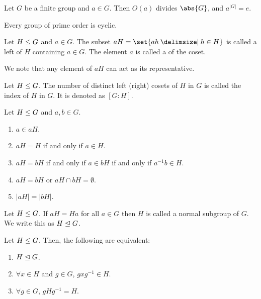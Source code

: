 \documentclass[11pt]{penrose}
\begin{document}
\begin{ncor}
    Let $G$ be a finite group and $a \in G$. Then $O(a)$ divides $\abs{G}$, and $a^{|G|} = e$.
\end{ncor}

\begin{ncor}
    Every group of prime order is cyclic.
\end{ncor}

\begin{ndfn}[Cosets]
    Let $H \mathrel{\leq} G$ and $a \in G$. The subset $aH = \set{ah \st h \in H}$ is called a left  of $H$ containing $a \in G$. The element $a$ is called a  of the coset.
\end{ndfn}

We note that any element of $aH$ can act as its representative.

\begin{ndfn}[Index]
    Let $H \mathrel{\leq} G$. The number of distinct left (right) cosets of $H$ in $G$ is called the index of $H$ in $G$. It is denoted as $[G:H]$.
\end{ndfn}

\begin{nthm}
    Let $H \mathrel{\leq} G$ and $a, b \in G$.
    \begin{enumerate}
        \item $a \in aH$.
        \item $aH = H$ if and only if $a \in H$.
        \item $aH = bH$ if and only if $a \in bH$ if and only if $a^{-1} b \in H$.
        \item $aH = bH$ or $aH \cap bH = \emptyset$.
        \item $|aH| = |bH|$.
    \end{enumerate}
\end{nthm}

\begin{ndfn}
    Let $H \mathrel{\leq} G$. If $aH = Ha$ for all $a \in G$ then $H$ is called a normal subgroup of $G$. We write this as $H \mathrel{\trianglelefteq} G$.
\end{ndfn}

\begin{nthm}
    Let $H \mathrel{\leq} G$. Then, the following are equivalent:
    \begin{enumerate}
        \item $H \mathrel{\trianglelefteq} G$.
        \item $\forall x \in H$ and $g \in G$, $g x g^{-1} \in H$.
        \item $\forall g \in G$, $g H g^{-1} = H$.
    \end{enumerate}
\end{nthm}
\end{document}
